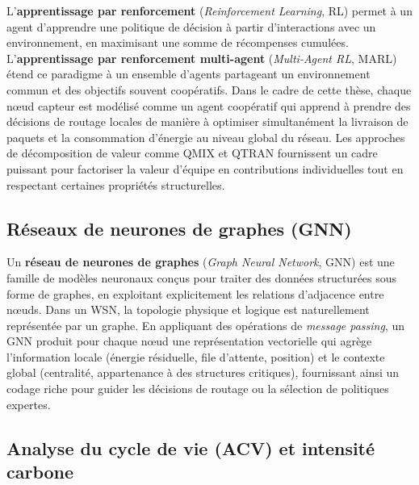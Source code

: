 L'\textbf{apprentissage par renforcement} (\emph{Reinforcement Learning}, RL) permet à un agent d'apprendre une politique de décision à partir d'interactions avec un environnement, en maximisant une somme de récompenses cumulées\cite{mnih2015dqn}. L'\textbf{apprentissage par renforcement multi-agent} (\emph{Multi-Agent RL}, MARL) étend ce paradigme à un ensemble d'agents partageant un environnement commun et des objectifs souvent coopératifs\cite{noauthor_multi-agent_nodate}. Dans le cadre de cette thèse, chaque nœud capteur est modélisé comme un agent coopératif qui apprend à prendre des décisions de routage locales de manière à optimiser simultanément la livraison de paquets et la consommation d'énergie au niveau global du réseau\cite{rashid2018qmix,son2019qtran,Hayes2022MOMARL}. Les approches de décomposition de valeur comme QMIX et QTRAN fournissent un cadre puissant pour factoriser la valeur d'équipe en contributions individuelles tout en respectant certaines propriétés structurelles\cite{rashid2018qmix,son2019qtran,Wang2021QPLEX}.

\subsection*{Réseaux de neurones de graphes (GNN)}

Un \textbf{réseau de neurones de graphes} (\emph{Graph Neural Network}, GNN) est une famille de modèles neuronaux conçus pour traiter des données structurées sous forme de graphes, en exploitant explicitement les relations d'adjacence entre nœuds\cite{gilmer2017mpnn,kipf2017semi,velickovic2018gat}. Dans un WSN, la topologie physique et logique est naturellement représentée par un graphe\cite{al_qundus_wireless_2020,erdelj2017disaster}. En appliquant des opérations de \emph{message passing}, un GNN produit pour chaque nœud une représentation vectorielle qui agrège l'information locale (énergie résiduelle, file d'attente, position) et le contexte global (centralité, appartenance à des structures critiques), fournissant ainsi un codage riche pour guider les décisions de routage ou la sélection de politiques expertes\cite{liu2024gnncomm,Nguyen2025GNNIoT}.

\subsection*{Analyse du cycle de vie (ACV) et intensité carbone}

